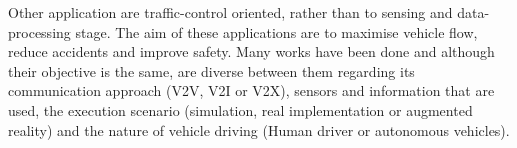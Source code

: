 Other application are traffic-control oriented, rather than to sensing and data-processing stage. The aim of these applications are to maximise vehicle flow, reduce accidents and improve safety. Many works have been done and although their objective is the same, are diverse between them regarding its communication approach (V2V, V2I or V2X), sensors and information that are used, the execution scenario (simulation, real implementation or augmented reality) and the nature of vehicle driving (Human driver or autonomous vehicles).


